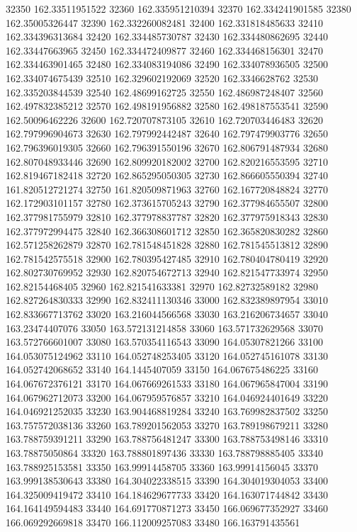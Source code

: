 {32350 162.33511951522
32360 162.335951210394
32370 162.334241901585
32380 162.35005326447
32390 162.332260082481
32400 162.331818485633
32410 162.334396313684
32420 162.334485730787
32430 162.334480862695
32440 162.33447663965
32450 162.334472409877
32460 162.334468156301
32470 162.334463901465
32480 162.334083194086
32490 162.334078936505
32500 162.334074675439
32510 162.329602192069
32520 162.3346628762
32530 162.335203844539
32540 162.48699162725
32550 162.486987248407
32560 162.497832385212
32570 162.498191956882
32580 162.498187553541
32590 162.50096462226
32600 162.720707873105
32610 162.720703446483
32620 162.797996904673
32630 162.797992442487
32640 162.797479903776
32650 162.796396019305
32660 162.796391550196
32670 162.806791487934
32680 162.807048933446
32690 162.809920182002
32700 162.820216553595
32710 162.819467182418
32720 162.865295050305
32730 162.866605550394
32740 161.820512721274
32750 161.820509871963
32760 162.167720848824
32770 162.172903101157
32780 162.373615705243
32790 162.377984655507
32800 162.377981755979
32810 162.377978837787
32820 162.377975918343
32830 162.377972994475
32840 162.366308601712
32850 162.365820830282
32860 162.571258262879
32870 162.781548451828
32880 162.781545513812
32890 162.781542575518
32900 162.780395427485
32910 162.780404780419
32920 162.802730769952
32930 162.820754672713
32940 162.821547733974
32950 162.82154468405
32960 162.821541633381
32970 162.82732589182
32980 162.827264830333
32990 162.832411130346
33000 162.832389897954
33010 162.833667713762
33020 163.216044566568
33030 163.216206734657
33040 163.23474407076
33050 163.572131214858
33060 163.571732629568
33070 163.572766601007
33080 163.570354116543
33090 164.05307821266
33100 164.053075124962
33110 164.052748253405
33120 164.052745161078
33130 164.052742068652
33140 164.1445407059
33150 164.067675486225
33160 164.067672376121
33170 164.067669261533
33180 164.067965847004
33190 164.067962712073
33200 164.067959576857
33210 164.046924401649
33220 164.046921252035
33230 163.904468819284
33240 163.769982837502
33250 163.757572038136
33260 163.789201562053
33270 163.789198679211
33280 163.788759391211
33290 163.788756481247
33300 163.788753498146
33310 163.78875050864
33320 163.788801897436
33330 163.788798885405
33340 163.788925153581
33350 163.99914458705
33360 163.99914156045
33370 163.999138530643
33380 164.304022338515
33390 164.304019304053
33400 164.325009419472
33410 164.184629677733
33420 164.163071744842
33430 164.164149594483
33440 164.691770871273
33450 166.069677352927
33460 166.069292669818
33470 166.112009257083
33480 166.163791435561
}
